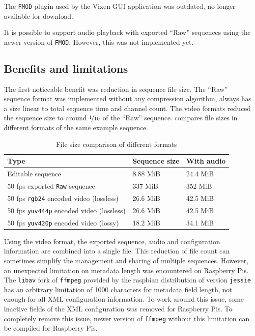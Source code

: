 The \texttt{FMOD} plugin used by the Vixen GUI application was outdated,  no longer available for download.


It is possible to support audio playback with exported ``Raw'' sequences using the newer version of \texttt{FMOD}. However, this was not implemented yet.


\subsection{Benefits and limitations}

The first noticeable benefit was reduction in sequence file size. The ``Raw'' sequence format was implemented without any compression algorithm,  always has a size linear to total sequence time and channel count. The video formats reduced the sequence size to around $\nicefrac{1}{10}$ of the ``Raw'' sequence.  compares file sizes in different formats of the same example sequence.

\begin{table}[t]
  \centering
  \begin{tabular}{l|l|l}
    \hline
    \textbf{Type} & \textbf{Sequence size} & \textbf{With audio} \\ \hline
    \hline
    Editable sequence                                 & 8.88 MiB  & 24.4 MiB  \\ \hline
    \hline
    50 fps exported \texttt{Raw} sequence             & 337 MiB   & 352 MiB   \\ \hline
    50 fps \texttt{rgb24} encoded video (lossless)    & 26.6 MiB  & 42.5 MiB  \\ \hline
    50 fps \texttt{yuv444p} encoded video (lossless)  & 26.6 MiB  & 42.5 MiB  \\ \hline
    50 fps \texttt{yuv420p} encoded video (lossy)     & 18.2 MiB  & 34.1 MiB  \\ \hline
  \end{tabular}
  \caption{\footnotesize File size comparison of different formats}
  \label{tbl:size}
\end{table}

Using the video format, the exported sequence, audio and configuration information are combined into a single file. This reduction of file count can sometimes simplify the management and sharing of multiple sequences. However, an unexpected limitation on metadata length was encountered on Raspberry Pis. The \texttt{libav} fork of \texttt{ffmpeg} provided by the raspbian distribution of version \texttt{jessie} has an arbitrary limitation of 1000 characters for metadata field length, not enough for all XML configuration information. To work around this issue, some inactive fields of the XML configuration was removed for Raspberry Pis. To completely remove this issue, newer version of \texttt{ffmpeg} without this limitation can be compiled for Raspberry Pis.

